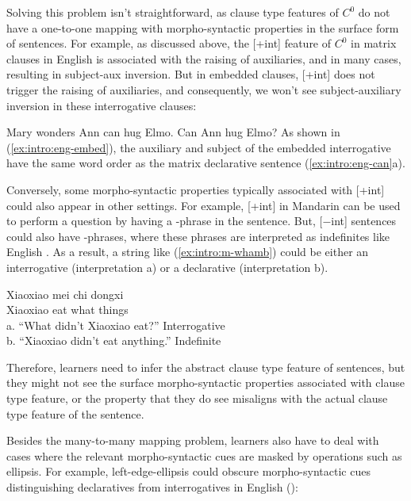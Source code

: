 {Solving this problem isn't straightforward, as clause type features of $C^{0}$ do not have a one-to-one mapping with morpho-syntactic properties in the surface form of sentences. For example, as discussed above, the [+int] feature of $C^{0}$ in matrix clauses in English is associated with the raising of auxiliaries, and in many cases, resulting in subject-aux inversion. But in embedded clauses, [+int] does not trigger the raising of auxiliaries, and consequently, we won't see subject-auxiliary inversion in these interrogative clauses: %

Mary wonders 
\eex
{}
\bxl
Ann can hug Elmo.
\ex Can Ann hug Elmo?
\exl
\eex
As shown in (\ref{ex:intro:eng-embed}), the auxiliary  and subject  of the embedded interrogative have the same word order as the matrix declarative sentence (\ref{ex:intro:eng-can}a).


Conversely, some morpho-syntactic properties typically associated with [+int] could also appear in other settings. For example, [+int] in Mandarin can be used to perform a question by having a \twh-phrase in the sentence. But, [$-$int] sentences could also have \twh-phrases, where these phrases are interpreted as indefinites like English . As a result, a string like (\ref{ex:intro:m-whamb}) could be either an interrogative (interpretation a) or a declarative (interpretation b). 


\gll Xiaoxiao mei 	chi 	 dongxi\\ 
Xiaoxiao \Neg{} 	eat	what	things\\
a.	``What didn’t Xiaoxiao eat?''	\hfill Interrogative \twh\\
b.	``Xiaoxiao didn’t eat anything.''		\hfill Indefinite \twh
\eex

Therefore, learners need to infer the abstract clause type feature of sentences, but they might not see the surface morpho-syntactic properties associated with clause type feature, or the property that they do see misaligns with the actual clause type feature of the sentence.

Besides the many-to-many mapping problem, learners also have to deal with cases where the relevant morpho-syntactic cues are masked by operations such as ellipsis.  For example, left-edge-ellipsis could obscure morpho-syntactic cues distinguishing declaratives from interrogatives in English (\cite{zwickypullum1983leftedge}):

}
